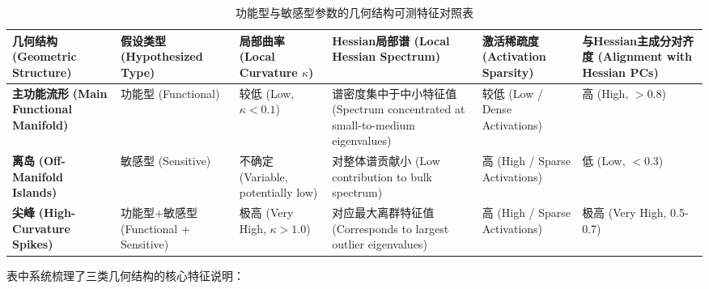 \documentclass[letterpaper,twocolumn,10pt]{article}
\begin{document}
\begin{table*}[t]
\centering
\tiny
\caption{功能型与敏感型参数的几何结构可测特征对照表}
\begin{tabular}{@{}p{2.4cm}p{2.2cm}p{2.0cm}p{2.8cm}p{2.2cm}p{2.2cm}@{}}
\toprule
\textbf{几何结构} \newline \textbf{(Geometric Structure)} & 
\textbf{假设类型} \newline \textbf{(Hypothesized Type)} & 
\textbf{局部曲率} \newline \textbf{(Local Curvature $\kappa$)} & 
\textbf{Hessian局部谱} \newline \textbf{(Local Hessian Spectrum)} & 
\textbf{激活稀疏度} \newline \textbf{(Activation Sparsity)} & 
\textbf{与Hessian主成分对齐度} \newline \textbf{(Alignment with Hessian PCs)} \\
\midrule
\textbf{主功能流形} \newline \textbf{(Main Functional Manifold)} & 
功能型 \newline (Functional) & 
较低 \newline (Low, $\kappa < 0.1$) & 
谱密度集中于中小特征值 (Spectrum concentrated at small-to-medium eigenvalues) & 
较低 (Low / Dense Activations) & 
高 \newline (High, $> 0.8$) \\
\midrule
\textbf{离岛} \newline \textbf{(Off-Manifold Islands)} & 
敏感型 \newline (Sensitive) & 
不确定 \newline (Variable, potentially low) & 
对整体谱贡献小 (Low contribution to bulk spectrum) & 
高 (High / Sparse Activations) & 
低 \newline (Low, $< 0.3$) \\
\midrule
\textbf{尖峰} \newline \textbf{(High-Curvature Spikes)} & 
功能型+敏感型 \newline (Functional + Sensitive) & 
极高 \newline (Very High, $\kappa > 1.0$) & 
对应最大离群特征值 (Corresponds to largest outlier eigenvalues) & 
高 (High / Sparse Activations) & 
极高 \newline (Very High, 0.5-0.7) \\
\bottomrule
\end{tabular}
\label{tab:observability}
\end{table*}

表中系统梳理了三类几何结构的核心特征说明：
\end{document}
